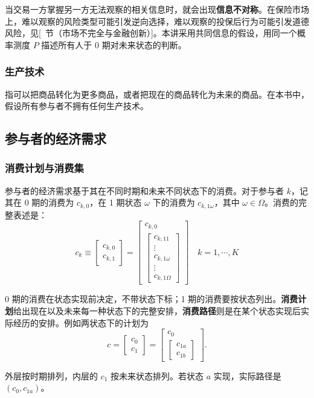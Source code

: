 当交易一方掌握另一方无法观察的相关信息时，就会出现\textbf{信息不对称}。在保险市场上，难以观察的风险类型可能引发逆向选择，难以观察的投保后行为可能引发道德风险，见[~节（市场不完全与金融创新）]。本讲采用共同信息的假设，用同一个概率测度 $P$ 描述所有人于 $0$ 期对未来状态的判断。
\subsubsection{生产技术}
指可以把商品转化为更多商品，或者把现在的商品转化为未来的商品。在本书中，假设所有参与者不拥有任何生产技术。


\subsection{参与者的经济需求}
\subsubsection{消费计划与消费集}
参与者的经济需求基于其在不同时期和未来不同状态下的消费。对于参与者 $k$，记其在 0 期的消费为 $c_{k,0}$，在 1 期状态 $\omega$ 下的消费为 $c_{k,1\omega}$，其中 $\omega\in\Omega$。消费的完整表述是：
\[
c_k \equiv \begin{bmatrix}c_{k,0} \\ c_{k,1}\end{bmatrix}=
\begin{bmatrix}c_{k,0} \\ \begin{bmatrix}c_{k,11} \\ \vdots \\ c_{k,1\omega} \\ \vdots \\ c_{k,1\Omega}\end{bmatrix}
\end{bmatrix} \quad k=1,\cdots,K
\]


\begin{tcolorbox}[knowledge,title=消费计划与消费路径]
0 期的消费在状态实现前决定，不带状态下标；1 期的消费要按状态列出。\textbf{消费计划}给出现在以及未来每一种状态下的完整安排，\textbf{消费路径}则是在某个状态实现后实际经历的安排。例如两状态下的计划为
\[
 c=\begin{bmatrix}c_0\\c_1\end{bmatrix}
  =\begin{bmatrix}c_0\\[1pt]\begin{bmatrix}c_{1a}\\c_{1b}\end{bmatrix}\end{bmatrix}.
\]

外层按时期排列，内层的 $c_1$ 按未来状态排列。若状态 $a$ 实现，实际路径是 $(c_0,c_{1a})$。
\end{tcolorbox}


